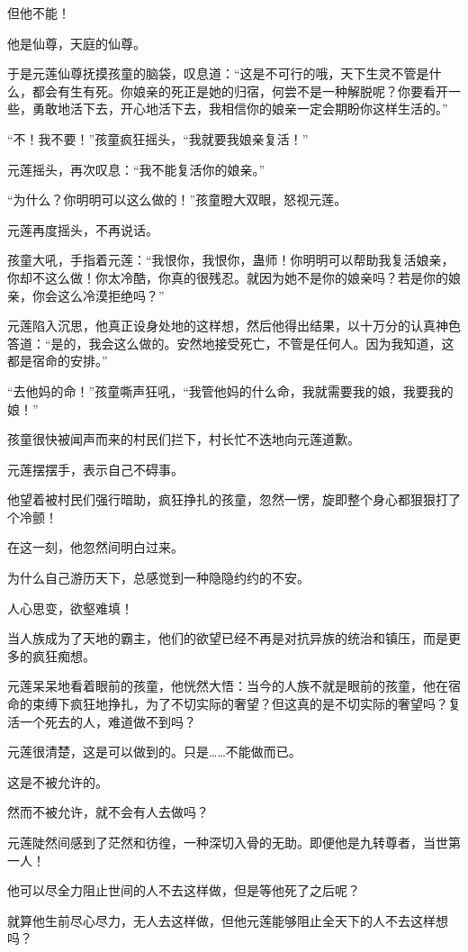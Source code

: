 \begin{this_body}
但他不能！

他是仙尊，天庭的仙尊。

于是元莲仙尊抚摸孩童的脑袋，叹息道：“这是不可行的哦，天下生灵不管是什么，都会有生有死。你娘亲的死正是她的归宿，何尝不是一种解脱呢？你要看开一些，勇敢地活下去，开心地活下去，我相信你的娘亲一定会期盼你这样生活的。”

“不！我不要！”孩童疯狂摇头，“我就要我娘亲复活！”

元莲摇头，再次叹息：“我不能复活你的娘亲。”

“为什么？你明明可以这么做的！”孩童瞪大双眼，怒视元莲。

元莲再度摇头，不再说话。

孩童大吼，手指着元莲：“我恨你，我恨你，蛊师！你明明可以帮助我复活娘亲，你却不这么做！你太冷酷，你真的很残忍。就因为她不是你的娘亲吗？若是你的娘亲，你会这么冷漠拒绝吗？”

元莲陷入沉思，他真正设身处地的这样想，然后他得出结果，以十万分的认真神色答道：“是的，我会这么做的。安然地接受死亡，不管是任何人。因为我知道，这都是宿命的安排。”

“去他妈的命！”孩童嘶声狂吼，“我管他妈的什么命，我就需要我的娘，我要我的娘！”

孩童很快被闻声而来的村民们拦下，村长忙不迭地向元莲道歉。

元莲摆摆手，表示自己不碍事。

他望着被村民们强行暗助，疯狂挣扎的孩童，忽然一愣，旋即整个身心都狠狠打了个冷颤！

在这一刻，他忽然间明白过来。

为什么自己游历天下，总感觉到一种隐隐约约的不安。

人心思变，欲壑难填！

当人族成为了天地的霸主，他们的欲望已经不再是对抗异族的统治和镇压，而是更多的疯狂痴想。

元莲呆呆地看着眼前的孩童，他恍然大悟：当今的人族不就是眼前的孩童，他在宿命的束缚下疯狂地挣扎，为了不切实际的奢望？但这真的是不切实际的奢望吗？复活一个死去的人，难道做不到吗？

元莲很清楚，这是可以做到的。只是……不能做而已。

这是不被允许的。

然而不被允许，就不会有人去做吗？

元莲陡然间感到了茫然和彷徨，一种深切入骨的无助。即便他是九转尊者，当世第一人！

他可以尽全力阻止世间的人不去这样做，但是等他死了之后呢？

就算他生前尽心尽力，无人去这样做，但他元莲能够阻止全天下的人不去这样想吗？


\end{this_body}
